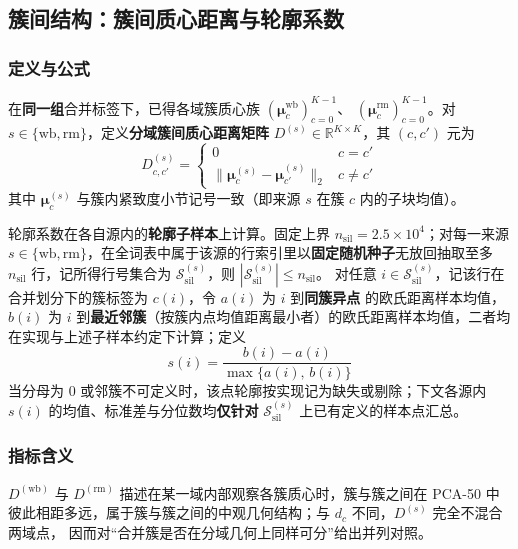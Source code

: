 \documentclass[withoutpreface]{cumcmthesis}
\begin{document}
\FloatBarrier

\subsection{簇间结构：簇间质心距离与轮廓系数}

\subsubsection{定义与公式}
在\textbf{同一组}合并标签下，已得各域簇质心族 $(\boldsymbol{\mu}^{\mathrm{wb}}_c)_{c=0}^{K-1}$、
$(\boldsymbol{\mu}^{\mathrm{rm}}_c)_{c=0}^{K-1}$。对 $s\in\{\mathrm{wb},\mathrm{rm}\}$，定义\textbf{分域簇间质心距离矩阵}
$D^{(s)}\in\mathbb{R}^{K\times K}$，其 $(c,c')$ 元为
\begin{equation}
  D^{(s)}_{c,c'} =
  \begin{cases}
    0 & c=c'\\[0.25em]
    \bigl\lVert \boldsymbol{\mu}^{(s)}_c - \boldsymbol{\mu}^{(s)}_{c'} \bigr\rVert_2 & c\neq c'
  \end{cases}
\end{equation}
其中 $\boldsymbol{\mu}^{(s)}_c$ 与簇内紧致度小节记号一致（即来源 $s$ 在簇 $c$ 内的子块均值）。

轮廓系数在各自源内的\textbf{轮廓子样本}上计算。固定上界 $n_{\mathrm{sil}}=2.5\times 10^4$；对每一来源
$s\in\{\mathrm{wb},\mathrm{rm}\}$，在全词表中属于该源的行索引里以\textbf{固定随机种子}无放回抽取至多
$n_{\mathrm{sil}}$ 行，记所得行号集合为 $\mathcal{S}_{\mathrm{sil}}^{(s)}$，则 $|\mathcal{S}_{\mathrm{sil}}^{(s)}|\leq n_{\mathrm{sil}}$。
对任意 $i\in\mathcal{S}_{\mathrm{sil}}^{(s)}$，记该行在合并划分下的簇标签为 $c(i)$，令 $a(i)$ 为 $i$ 到\textbf{同簇异点}
的欧氏距离样本均值，$b(i)$ 为 $i$ 到\textbf{最近邻簇}（按簇内点均值距离最小者）的欧氏距离样本均值，二者均在实现与上述子样本约定下计算；定义
\begin{equation}
  s(i)=\frac{b(i)-a(i)}{\max\{a(i),\,b(i)\}} 
\end{equation}
当分母为 $0$ 或邻簇不可定义时，该点轮廓按实现记为缺失或剔除；下文各源内 $s(i)$ 的均值、标准差与分位数均\textbf{仅针对}
$\mathcal{S}_{\mathrm{sil}}^{(s)}$ 上已有定义的样本点汇总。

\subsubsection{指标含义}
$D^{(\mathrm{wb})}$ 与 $D^{(\mathrm{rm})}$ 描述在某一域内部观察各簇质心时，簇与簇之间在 PCA-50 中
彼此相距多远，属于簇与簇之间的中观几何结构；与 $d_c$ 不同，$D^{(s)}$ 完全不混合两域点，
因而对“合并簇是否在分域几何上同样可分”给出并列对照。
\end{document}
